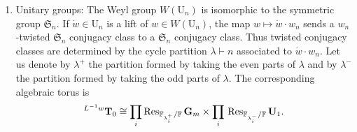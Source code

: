 \documentclass[12pt, reqno]{amsart}
\theoremstyle{definition}
\theoremstyle{definition}
\theoremstyle{definition}
\newcommand{\diag}{\mathrm{diag}}
\newcommand{\UnitaryGroup}{\mathrm{U}}
\newcommand{\finiteField}{\mathbb{F}}
\newcommand{\finiteFieldExtension}[1]{\finiteField_{#1}}
\newcommand{\restrictionOfScalars}[3]{\operatorname{Res}_{#1 \slash #2}{#3}}
\newcommand{\multiplcativeScheme}{\algebraicGroup{G}_m}
\newcommand{\algebraicGroup}[1]{\boldsymbol{\mathrm{#1}}}
\newcommand{\SymmetricGroup}{\mathfrak{S}}
\begin{document}
\begin{enumerate}
    \item Unitary groups: The Weyl group $W\left(\algebraicGroup{\UnitaryGroup}_n\right)$ is isomorphic to the symmetric group $\SymmetricGroup_n$. If $\dot{w} \in \algebraicGroup{\UnitaryGroup}_n$ is a lift of $w \in W\left(\algebraicGroup{\UnitaryGroup}_n\right)$, the map $w \mapsto \dot{w} \cdot w_n$ sends a $w_n$-twisted $\SymmetricGroup_n$ conjugacy class to a $\SymmetricGroup_n$ conjugacy class. Thus twisted conjugacy classes are determined by the cycle partition $\lambda \vdash n$ associated to $\dot{w} \cdot w_n$. Let us denote by $\lambda^+$ the partition formed by taking the even parts of $\lambda$ and by $\lambda^{-}$ the partition formed by taking the odd parts of $\lambda$. The corresponding algebraic torus is
	$$^{L^{-1}w}\algebraicGroup{T}_0 \cong \prod_{i} 	\restrictionOfScalars{\finiteFieldExtension{\lambda^{+}_i}}{\finiteField}{\multiplcativeScheme} \times \prod_{i} \\
	\restrictionOfScalars{\finiteFieldExtension{\lambda_i^{-}}}{\finiteField}{\algebraicGroup{\UnitaryGroup}_1}.$$
	

\end{enumerate}
\end{document}
